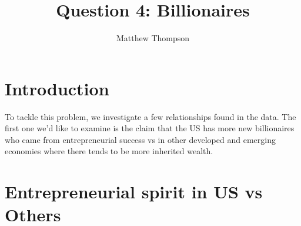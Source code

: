 \documentclass[11pt,preprint]{elsarticle}
\numberwithin{equation}{section}
\numberwithin{figure}{section}
\numberwithin{table}{section}
\begin{document}
\begin{frontmatter}  %

\title{Question 4: Billionaires}





\author[Add1]{Matthew Thompson}





\address[Add1]{Department of Economics, Stellenbosch University}



\vspace{1cm}





\vspace{0.5cm}

\end{frontmatter}

\setcounter{footnote}{0}



\pagestyle{fancy}
\chead{}
\rhead{}
\lfoot{}
\lhead{}
\cfoot{}


\headsep 35pt %




\section{\texorpdfstring{Introduction
\label{Introduction}}{Introduction }}\label{introduction}

To tackle this problem, we investigate a few relationships found in the
data. The first one we'd like to examine is the claim that the US has
more new billionaires who came from entrepreneurial success vs in other
developed and emerging economies where there tends to be more inherited
wealth.

\section{Entrepreneurial spirit in US vs
Others}\label{entrepreneurial-spirit-in-us-vs-others}
\end{document}
